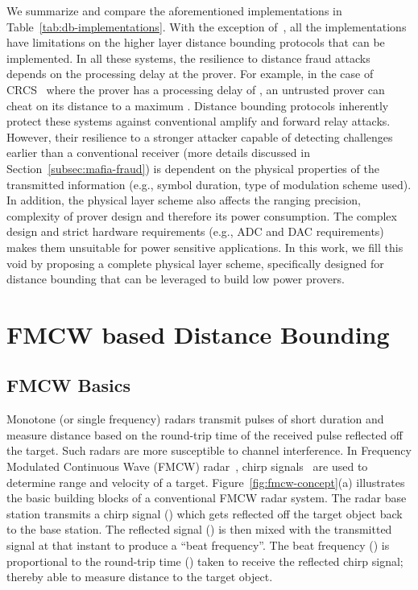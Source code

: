 \documentclass{sig-alternate-10pt}
\newcommand{\eg}{e.g.,\xspace}
\begin{document}
We summarize and compare the aforementioned implementations in
Table~\ref{tab:db-implementations}. With the exception of~\cite{Tippenhauer12},
all the implementations have limitations on the higher layer distance bounding
protocols that can be implemented. In all these systems, the resilience to
distance fraud attacks depends on the processing delay at the prover. For
example, in the case of CRCS~\cite{RasmussenAug10} where the prover has a
processing delay of , an untrusted prover can cheat on its distance to a
maximum . Distance bounding protocols inherently protect these
systems against conventional amplify and forward relay attacks. However, their
resilience to a stronger attacker capable of detecting challenges earlier than a
conventional receiver (more details discussed in
Section~\ref{subsec:mafia-fraud}) is dependent on the physical properties of
the transmitted information (\eg symbol duration, type of modulation scheme
used). In addition, the physical layer scheme also affects the ranging
precision, complexity of prover design and therefore its power consumption. The
complex design and strict hardware requirements (\eg ADC and DAC requirements)
makes them unsuitable for power sensitive applications. In this work, we fill
this void by proposing a complete physical layer scheme, specifically designed
for distance bounding that can be leveraged to build low power provers.
 
\section{FMCW based Distance Bounding}
\label{sec:fmcw-based-db}

\subsection{FMCW Basics}
\label{sec:fmcw-radar-background}

Monotone (or single frequency) radars transmit pulses of short duration and
measure distance based on the round-trip time of the received pulse reflected
off the target. Such radars are more susceptible to channel interference. In
Frequency Modulated Continuous Wave (FMCW) radar~\cite{StoveOct92}, chirp
signals~\cite{BerniJun73} are used to determine range and velocity of a target.
Figure~\ref{fig:fmcw-concept}(a) illustrates the basic building blocks of a
conventional FMCW radar system. The radar base station transmits a chirp signal
() which gets reflected off the target object back to the base
station. The reflected signal () is then mixed with the transmitted
signal at that instant to produce a ``beat frequency''. The beat frequency
() is proportional to the round-trip time () taken to receive
the reflected chirp signal; thereby able to measure distance  to the target
object.
\end{document}
